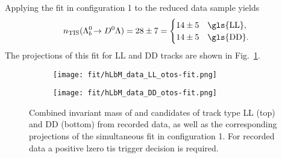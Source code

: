 Applying the fit in configuration 1 to the reduced data sample yields
\begin{equation*}
    n_\text{TIS}(\decay{\Lb}{\Dz\Lz}) = 28 \pm 7 =
    \begin{cases}
        14 \pm 5 & \text{\gls{LL}}, \\
        14 \pm 5 & \text{\gls{DD}}.
    \end{cases}
\end{equation*}
The projections of this fit for \gls{LL} and \gls{DD} tracks are shown in Fig.~\ref{fig:fit_hLbM_data_fit1_LLDD_tis}.
\begin{figure}[htbp]
    \centering
    \begin{subfigure}[b]{\textwidth}
        \centering
        \texttt{[image: fit/hLbM\_data\_LL\_otos-fit.png]}
    \end{subfigure}
    \par\bigskip 
    \begin{subfigure}[b]{\textwidth}
        \centering
        \texttt{[image: fit/hLbM\_data\_DD\_otos-fit.png]}
    \end{subfigure}
    \caption{Combined invariant mass of \Dz and \Lz candidates of track type \gls{LL} (top) and \gls{DD} (bottom) from recorded data, as well as the corresponding projections of the simultaneous fit in configuration 1. For recorded data a positive \gls{lzero} \gls{tis} trigger decision is required.}
    \label{fig:fit_hLbM_data_fit1_LLDD_tis}
\end{figure}

